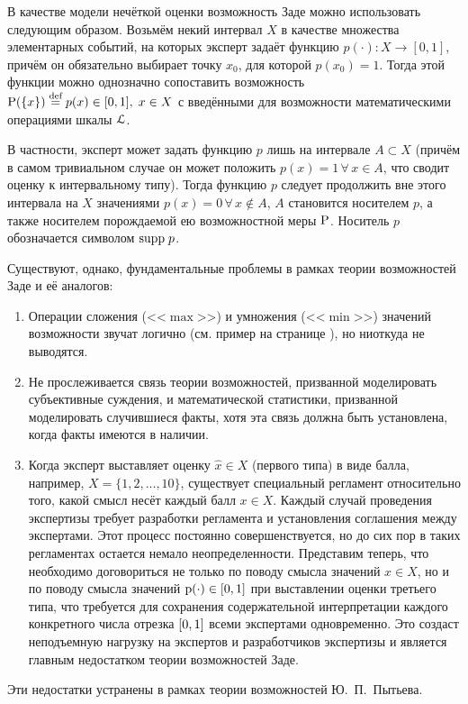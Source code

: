 В качестве модели нечёткой оценки возможность Заде можно использовать следующим образом. Возьмём некий интервал $X$ в качестве множества элементарных событий, на которых эксперт задаёт функцию $p(\cdot): X \rightarrow [0,1]$, причём он обязательно выбирает точку $x_0$, для которой $p(x_0) = 1$. Тогда этой функции можно однозначно сопоставить возможность $\P(\{x\}) \define= p(x) \in \zo,\; x\in X$ с введёнными для возможности математическими операциями шкалы $\scL$. 

В частности, эксперт может задать функцию $p$ лишь на интервале $A \subset X$ (причём в самом тривиальном случае он может положить $p(x) = 1\, \forall\, x \in A$, что сводит оценку к интервальному типу). Тогда функцию $p$ следует продолжить вне этого интервала на $X$ значениями $p(x) = 0\, \forall\, x \notin A$, $A$ становится носителем $p$, а также носителем порождаемой ею возможностной меры $\P$. Носитель $p$ обозначается символом $\supp\; p$.

Существуют, однако, фундаментальные проблемы в рамках теории возможностей Заде и её аналогов:
\begin{enumerate}
\item
Операции сложения (<<$\max$>>) и умножения (<<$\min$>>) значений возможности звучат логично (см. пример на странице \pageref{example_zadeh}), но ниоткуда не выводятся.
\item
Не прослеживается связь теории возможностей, призванной моделировать субъективные суждения, и математической статистики, призванной моделировать случившиеся факты, хотя эта связь должна быть установлена, когда факты имеются в наличии.
\item
Когда эксперт выставляет оценку $\hat{x}  \in X$ (первого типа) в виде балла, например, $X = \{1, 2, ..., 10\}$, существует специальный регламент относительно того, какой смысл несёт каждый балл $x \in X$. Каждый случай проведения экспертизы требует разработки регламента и установления соглашения между экспертами. Этот процесс постоянно совершенствуется, но до сих пор в таких регламентах остается немало неопределенности. Представим теперь, что необходимо договориться не только по поводу смысла значений $x \in X$, но и по поводу смысла значений $\p(\cdot) \in \zo$ при выставлении оценки третьего типа, что требуется для сохранения содержательной интерпретации каждого конкретного числа отрезка $\zo$ всеми экспертами одновременно. Это создаст неподъемную нагрузку на экспертов и разработчиков экспертизы и является главным недостатком теории возможностей Заде. 
\end{enumerate}
Эти недостатки устранены в рамках теории возможностей Ю.~П.~Пытьева.


